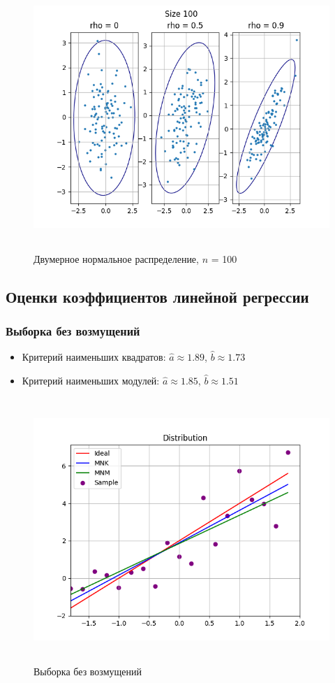 \begin{figure}[H]
	\centering
	\includegraphics[width = 16cm, height = 10cm]{res/size100_t1.png}
	\caption{Двумерное нормальное распределение, $n$ = 100}
	\label{fig:n100}
\end{figure}


\subsection{Оценки коэффициентов линейной регрессии}
\subsubsection{Выборка без возмущений}
	\begin{itemize}
		\item{Критерий наименьших квадратов:}
		$\hat{a}\approx 1.89$, $\hat{b}\approx 1.73$
		\item{Критерий наименьших модулей:}
		$\hat{a}\approx 1.85$, $\hat{b}\approx 1.51$
	\end{itemize}
	\begin{figure}[H]
		\centering
		\includegraphics[width = 12cm, height = 10cm]{res/distr_t2.png}
		\caption{Выборка без возмущений}
		\label{w/o_pert}
	\end{figure}

